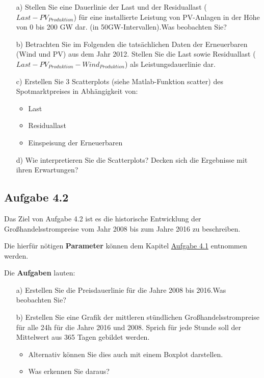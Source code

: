 \documentclass[a4paper,12pt]{article}
\begin{document}
	\begin{itemize}
		\item[a)] Stellen Sie eine Dauerlinie der Last und der Residuallast ($Last - PV_{Produktion}$) für eine installierte Leistung von PV-Anlagen in der Höhe von 0 bis 200 GW dar. (in 50GW-Intervallen).\newline Was beobachten Sie?
		\item[b)] Betrachten Sie im Folgenden die tatsächlichen Daten der Erneuerbaren (Wind und PV) aus dem Jahr 2012. Stellen Sie die Last sowie Residuallast ($Last - PV_{Produktion} - Wind_{Produktion}$) als Leistungsdauerlinie dar.
		\item[c)] Erstellen Sie 3 Scatterplots (siehe Matlab-Funktion scatter) des Spotmarktpreises in Abhängigkeit von:
		\begin{itemize}
			\item Last
			\item Residuallast
			\item Einspeisung der Erneuerbaren
		\end{itemize}
		\item[d)] Wie interpretieren Sie die Scatterplots? Decken sich die Ergebnisse mit ihren Erwartungen?
	\end{itemize}
	\subsection{Aufgabe 4.2}
	\label{sec:Aufgabenstellung42}
	Das Ziel von Aufgabe 4.2 ist es die historische Entwicklung der Großhandelsstrompreise vom Jahr 2008 bis zum Jahre 2016 zu beschreiben.\\ \par
	\noindent	Die hierfür nötigen \textbf{Parameter} können dem Kapitel \hyperref[sec:Aufgabenstellung41]{Aufgabe 4.1} entnommen werden.\\ \par
	\noindent Die \textbf{Aufgaben} lauten:
	\begin{itemize}
		\item[a)] Erstellen Sie die Preisdauerlinie für die Jahre 2008 bis 2016.\newline Was beobachten Sie?
		\item[b)] Erstellen Sie eine Grafik der mittleren stündlichen Großhandelsstrompreise für alle 24h für die Jahre 2016 und 2008. Sprich für jede Stunde soll der Mittelwert aus 365 Tagen gebildet werden.
		\begin{itemize}
			\item Alternativ können Sie dies auch mit einem Boxplot darstellen.
			\item Was erkennen Sie daraus?
		\end{itemize}
	\end{itemize}
\end{document}
